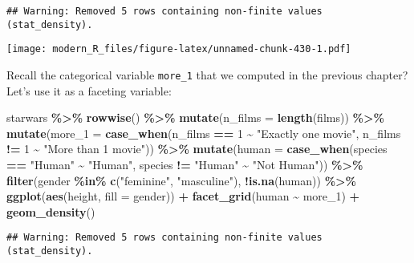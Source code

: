\documentclass[
]{article}
\newenvironment{Shaded}{\begin{snugshade}}{\end{snugshade}}
\newcommand{\DataTypeTok}[1]{\textcolor[rgb]{0.13,0.29,0.53}{#1}}
\newcommand{\DecValTok}[1]{\textcolor[rgb]{0.00,0.00,0.81}{#1}}
\newcommand{\KeywordTok}[1]{\textcolor[rgb]{0.13,0.29,0.53}{\textbf{#1}}}
\newcommand{\NormalTok}[1]{#1}
\newcommand{\OperatorTok}[1]{\textcolor[rgb]{0.81,0.36,0.00}{\textbf{#1}}}
\newcommand{\StringTok}[1]{\textcolor[rgb]{0.31,0.60,0.02}{#1}}
\begin{document}
\begin{verbatim}
## Warning: Removed 5 rows containing non-finite values (stat_density).
\end{verbatim}

\texttt{[image: modern\_R\_files/figure-latex/unnamed-chunk-430-1.pdf]}

Recall the categorical variable \texttt{more\_1} that we computed in the previous chapter? Let's use it as
a faceting variable:

\begin{Shaded}
\begin{Highlighting}[]
\NormalTok{starwars }\OperatorTok{\%\textgreater{}\%}
\StringTok{  }\KeywordTok{rowwise}\NormalTok{() }\OperatorTok{\%\textgreater{}\%}
\StringTok{  }\KeywordTok{mutate}\NormalTok{(}\DataTypeTok{n\_films =} \KeywordTok{length}\NormalTok{(films)) }\OperatorTok{\%\textgreater{}\%}
\StringTok{  }\KeywordTok{mutate}\NormalTok{(}\DataTypeTok{more\_1 =} \KeywordTok{case\_when}\NormalTok{(n\_films }\OperatorTok{==}\StringTok{ }\DecValTok{1} \OperatorTok{\textasciitilde{}}\StringTok{ "Exactly one movie"}\NormalTok{,}
\NormalTok{                            n\_films }\OperatorTok{!=}\StringTok{ }\DecValTok{1} \OperatorTok{\textasciitilde{}}\StringTok{ "More than 1 movie"}\NormalTok{)) }\OperatorTok{\%\textgreater{}\%}
\StringTok{  }\KeywordTok{mutate}\NormalTok{(}\DataTypeTok{human =} \KeywordTok{case\_when}\NormalTok{(species }\OperatorTok{==}\StringTok{ "Human"} \OperatorTok{\textasciitilde{}}\StringTok{ "Human"}\NormalTok{,}
\NormalTok{                           species }\OperatorTok{!=}\StringTok{ "Human"} \OperatorTok{\textasciitilde{}}\StringTok{ "Not Human"}\NormalTok{)) }\OperatorTok{\%\textgreater{}\%}
\StringTok{  }\KeywordTok{filter}\NormalTok{(gender }\OperatorTok{\%in\%}\StringTok{ }\KeywordTok{c}\NormalTok{(}\StringTok{"feminine"}\NormalTok{, }\StringTok{"masculine"}\NormalTok{), }\OperatorTok{!}\KeywordTok{is.na}\NormalTok{(human)) }\OperatorTok{\%\textgreater{}\%}
\StringTok{  }\KeywordTok{ggplot}\NormalTok{(}\KeywordTok{aes}\NormalTok{(height, }\DataTypeTok{fill =}\NormalTok{ gender)) }\OperatorTok{+}
\StringTok{  }\KeywordTok{facet\_grid}\NormalTok{(human }\OperatorTok{\textasciitilde{}}\StringTok{ }\NormalTok{more\_}\DecValTok{1}\NormalTok{) }\OperatorTok{+}
\StringTok{  }\KeywordTok{geom\_density}\NormalTok{()}
\end{Highlighting}
\end{Shaded}

\begin{verbatim}
## Warning: Removed 5 rows containing non-finite values (stat_density).
\end{verbatim}
\end{document}
